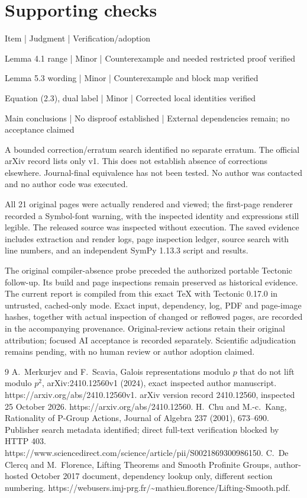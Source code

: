 \documentclass[10pt]{article}
\begin{document}
\section*{Supporting checks}
Item | Judgment | Verification/adoption\par
Lemma 4.1 range | Minor | Counterexample and needed restricted proof verified\par
Lemma 5.3 wording | Minor | Counterexample and block map verified\par
Equation (2.3), dual label | Minor | Corrected local identities verified\par
Main conclusions | No disproof established | External dependencies remain; no acceptance claimed\par
A bounded correction/erratum search identified no separate erratum. The official arXiv record lists only v1. This does not establish absence of corrections elsewhere. Journal-final equivalence has not been tested. No author was contacted and no author code was executed.\par
All 21 original pages were actually rendered and viewed; the first-page renderer recorded a Symbol-font warning, with the inspected identity and expressions still legible. The released source was inspected without execution. The saved evidence includes extraction and render logs, page inspection ledger, source search with line numbers, and an independent SymPy 1.13.3 script and results.\par
The original compiler-absence probe preceded the authorized portable Tectonic follow-up. Its build and page inspections remain preserved as historical evidence. The current report is compiled from this exact TeX with Tectonic 0.17.0 in untrusted, cached-only mode. Exact input, dependency, log, PDF and page-image hashes, together with actual inspection of changed or reflowed pages, are recorded in the accompanying provenance. Original-review actions retain their original attribution; focused AI acceptance is recorded separately. Scientific adjudication remains pending, with no human review or author adoption claimed.\par
9 A. Merkurjev and F. Scavia, Galois representations modulo \(p\) that do not lift modulo \(p^2\), arXiv:2410.12560v1 (2024), exact inspected author manuscript. https://arxiv.org/abs/2410.12560v1. arXiv version record 2410.12560, inspected 25 October 2026. https://arxiv.org/abs/2410.12560. H. Chu and M.-c. Kang, Rationality of P-Group Actions, Journal of Algebra 237 (2001), 673–690. Publisher search metadata identified; direct full-text verification blocked by HTTP 403. https://www.sciencedirect.com/science/article/pii/S0021869300986150. C. De Clercq and M. Florence, Lifting Theorems and Smooth Profinite Groups, author-hosted October 2017 document, dependency lookup only, different section numbering. https://webusers.imj-prg.fr/\textasciitilde{}mathieu.florence/Lifting-Smooth.pdf.\par
\end{document}
